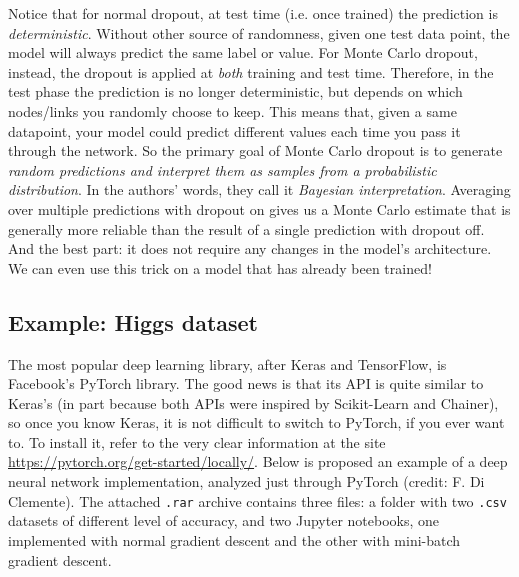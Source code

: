Notice that for normal dropout, at test time (i.e. once trained) the prediction is \emph{deterministic}. Without other source of randomness, given one test data point, the model will always predict the same label or value. For Monte Carlo dropout, instead, the dropout is applied at \emph{both} training and test time. Therefore, in the test phase the prediction is no longer deterministic, but depends on which nodes/links you randomly choose to keep. This means that, given a same datapoint, your model could predict different values each time you pass it through the network. So the primary goal of Monte Carlo dropout is to generate \emph{random predictions and interpret them as samples from a probabilistic distribution}. In the authors' words, they call it \emph{Bayesian interpretation}. Averaging over multiple predictions with dropout on gives us a Monte Carlo estimate that is generally more reliable than the result of a single prediction with dropout off. And the best part: it does not require any changes in the model’s architecture. We can even use this trick on a model that has already been trained!
\subsection{Example: Higgs dataset}
The most popular deep learning library, after Keras and TensorFlow, is Facebook's PyTorch library. The good news is that its API is quite similar to Keras's (in part because both APIs were inspired by Scikit-Learn and Chainer), so once you know Keras, it is not difficult to switch to PyTorch, if you ever want to. To install it, refer to the very clear information at the site \url{https://pytorch.org/get-started/locally/}. Below is proposed an example of a deep neural network implementation, analyzed just through PyTorch  (credit: F. Di Clemente). The attached \texttt{.rar} archive contains three files: a folder with two \texttt{.csv} datasets of different level of accuracy, and two Jupyter notebooks, one implemented with normal gradient descent and the other with mini-batch gradient descent.

